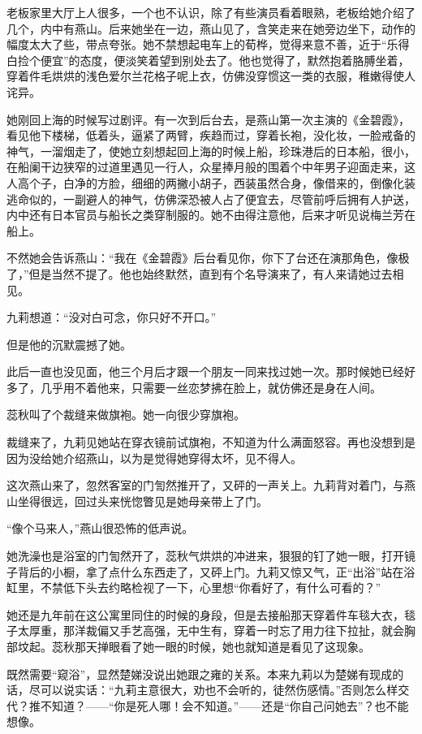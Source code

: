 \par 老板家里大厅上人很多，一个也不认识，除了有些演员看着眼熟，老板给她介绍了几个，内中有燕山。后来她坐在一边，燕山见了，含笑走来在她旁边坐下，动作的幅度太大了些，带点夸张。她不禁想起电车上的荀桦，觉得来意不善，近于“乐得白捡个便宜”的态度，便淡笑着望到别处去了。他也觉得了，默然抱着胳膊坐着，穿着件毛烘烘的浅色爱尔兰花格子呢上衣，仿佛没穿惯这一类的衣服，稚嫩得使人诧异。
\par 她刚回上海的时候写过剧评。有一次到后台去，是燕山第一次主演的《金碧霞》，看见他下楼梯，低着头，逼紧了两臂，疾趋而过，穿着长袍，没化妆，一脸戒备的神气，一溜烟走了，使她立刻想起回上海的时候上船，珍珠港后的日本船，很小，在船阑干边狭窄的过道里遇见一行人，众星捧月般的围着个中年男子迎面走来，这人高个子，白净的方脸，细细的两撇小胡子，西装虽然合身，像借来的，倒像化装逃命似的，一副避人的神气，仿佛深恐被人占了便宜去，尽管前呼后拥有人护送，内中还有日本官员与船长之类穿制服的。她不由得注意他，后来才听见说梅兰芳在船上。
\par 不然她会告诉燕山：“我在《金碧霞》后台看见你，你下了台还在演那角色，像极了，”但是当然不提了。他也始终默然，直到有个名导演来了，有人来请她过去相见。
\par 九莉想道：“没对白可念，你只好不开口。”
\par 但是他的沉默震撼了她。
\par 此后一直也没见面，他三个月后才跟一个朋友一同来找过她一次。那时候她已经好多了，几乎用不着他来，只需要一丝恋梦拂在脸上，就仿佛还是身在人间。
\par 蕊秋叫了个裁缝来做旗袍。她一向很少穿旗袍。
\par 裁缝来了，九莉见她站在穿衣镜前试旗袍，不知道为什么满面怒容。再也没想到是因为没给她介绍燕山，以为是觉得她穿得太坏，见不得人。
\par 这次燕山来了，忽然客室的门訇然推开了，又砰的一声关上。九莉背对着门，与燕山坐得很远，回过头来恍惚瞥见是她母亲带上了门。
\par “像个马来人，”燕山很恐怖的低声说。
\par 她洗澡也是浴室的门訇然开了，蕊秋气烘烘的冲进来，狠狠的钉了她一眼，打开镜子背后的小橱，拿了点什么东西走了，又砰上门。九莉又惊又气，正“出浴”站在浴缸里，不禁低下头去约略检视了一下，心里想“你看好了，有什么可看的？”
\par 她还是九年前在这公寓里同住的时候的身段，但是去接船那天穿着件车毯大衣，毯子太厚重，那洋裁偏又手艺高强，无中生有，穿着一时忘了用力往下拉扯，就会胸部坟起。蕊秋那天掸眼看了她一眼的时候，她也就知道是看见了这现象。
\par 既然需要“窥浴”，显然楚娣没说出她跟之雍的关系。本来九莉以为楚娣有现成的话，尽可以说实话：“九莉主意很大，劝也不会听的，徒然伤感情。”否则怎么样交代？推不知道？——“你是死人哪！会不知道。”——还是“你自己问她去”？也不能想像。
